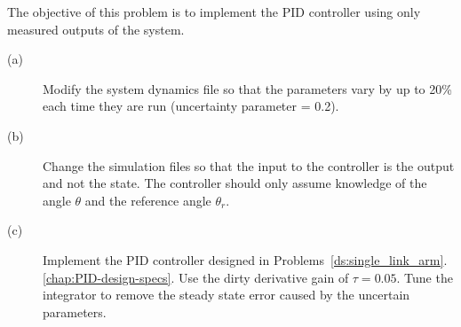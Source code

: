 

The objective of this problem is to implement the PID controller using only measured outputs of the system.
\begin{description}
\item[(a)]  Modify the system dynamics file so that the parameters vary by up to 20\% each time they are run (uncertainty parameter = 0.2).
\item[(b)]  Change the simulation files so that the input to the controller is the output and not the state. The controller should only assume knowledge of the angle $\theta$ and the reference angle $\theta_r$.
\item[(c)]  Implement the PID controller designed in Problems~\ref{ds:single_link_arm}.\ref{chap:PID-design-specs}.  Use the dirty derivative gain of $\tau=0.05$.  Tune the integrator to remove the steady state error caused by the uncertain parameters.
\end{description}
